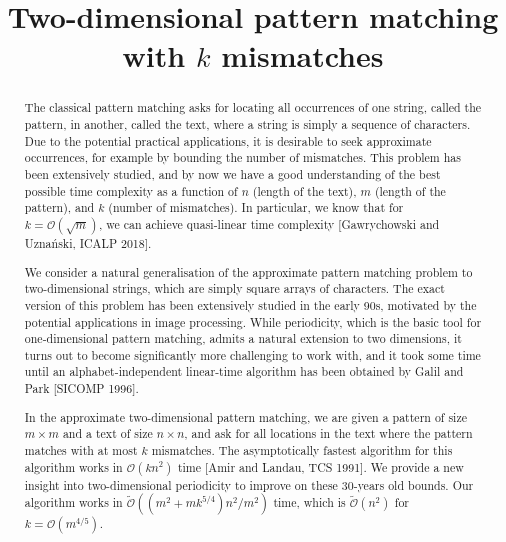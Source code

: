 \documentclass[11pt, letterpaper]{article}
\title{Two-dimensional pattern matching with $k$ mismatches}
\author{}
\theoremstyle{plain}
\theoremstyle{definition}
\theoremstyle{remark}
\renewcommand{\O}{\mathcal{O}}
\newcommand{\tO}{\tilde{\mathcal{O}}}
\begin{document}
\date{}
\maketitle

\begin{abstract}
The classical pattern matching asks for locating all occurrences of one string, called the pattern, in another, called the text, where
a string is simply a sequence of characters.
Due to the potential practical applications, it is desirable to seek approximate occurrences, for example by bounding the number
of mismatches. This problem has been extensively studied, and by now we have a good
understanding of the best possible time complexity as a function of $n$ (length of the text), $m$ (length of the pattern), and $k$
(number of mismatches).
In particular, we know that for $k=\O(\sqrt{m})$, we can achieve quasi-linear time complexity [Gawrychowski and Uznański, ICALP 2018].

We consider a natural generalisation of the approximate pattern matching problem to two-dimensional strings, which are simply
square arrays of characters. The exact version of this problem has been extensively studied in the early 90s, motivated by the
potential applications in image processing. While periodicity, which is the basic tool for one-dimensional pattern matching, 
admits a natural extension to two dimensions, it turns out to become significantly more challenging to work with,
and it took some time until an alphabet-independent linear-time algorithm has been obtained by Galil and Park [SICOMP 1996].

In the approximate two-dimensional pattern matching, we are given a pattern of size $m\times m$ and a text of size $n\times n$,
and ask for all locations in the text where the pattern matches with at most $k$ mismatches.
The asymptotically fastest algorithm for this algorithm works in $\O(kn^{2})$ time [Amir and Landau, TCS 1991].
We provide a new insight
into two-dimensional periodicity to improve on these 30-years old bounds.
Our algorithm works in $\tO((m^{2}+mk^{5/4})n^{2}/m^{2})$ time, which is $\tO(n^{2})$ for $k=\O(m^{4/5})$.
\end{abstract}

\thispagestyle{empty}
\clearpage
\setcounter{page}{1}
\end{document}
